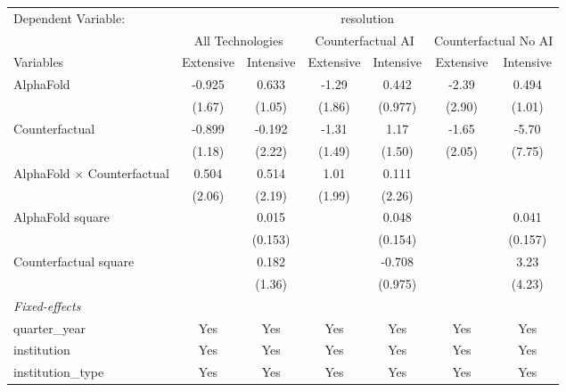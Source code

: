 \begingroup
\centering
\begin{tabular}{lcccccc}
   \tabularnewline \midrule \midrule
   Dependent Variable: & \multicolumn{6}{c}{resolution}\\
 & \multicolumn{2}{c}{All Technologies} & \multicolumn{2}{c}{Counterfactual AI} & \multicolumn{2}{c}{Counterfactual No AI} \\
\cmidrule(lr){1-1}\cmidrule(lr){2-3} \cmidrule(lr){4-5} \cmidrule(lr){6-7}
Variables & \multicolumn{1}{c}{Extensive} & \multicolumn{1}{c}{Intensive} & \multicolumn{1}{c}{Extensive} & \multicolumn{1}{c}{Intensive} & \multicolumn{1}{c}{Extensive} & \multicolumn{1}{c}{Intensive} \\
\cmidrule(lr){1-1}\cmidrule(lr){2-2} \cmidrule(lr){3-3} \cmidrule(lr){4-4} \cmidrule(lr){5-5} \cmidrule(lr){6-6} \cmidrule(lr){7-7}
   AlphaFold                          & -0.925 & 0.633   & -1.29  & 0.442   & -2.39  & 0.494\\   
                                      & (1.67) & (1.05)  & (1.86) & (0.977) & (2.90) & (1.01)\\   
   Counterfactual                     & -0.899 & -0.192  & -1.31  & 1.17    & -1.65  & -5.70\\   
                                      & (1.18) & (2.22)  & (1.49) & (1.50)  & (2.05) & (7.75)\\   
   AlphaFold $\times$ Counterfactual  & 0.504  & 0.514   & 1.01   & 0.111   &        &   \\   
                                      & (2.06) & (2.19)  & (1.99) & (2.26)  &        &   \\   
   AlphaFold square                   &        & 0.015   &        & 0.048   &        & 0.041\\   
                                      &        & (0.153) &        & (0.154) &        & (0.157)\\   
   Counterfactual square              &        & 0.182   &        & -0.708  &        & 3.23\\   
                                      &        & (1.36)  &        & (0.975) &        & (4.23)\\   
   \midrule
   \emph{Fixed-effects}\\
   quarter\_year                      & Yes    & Yes     & Yes    & Yes     & Yes    & Yes\\  
   institution                        & Yes    & Yes     & Yes    & Yes     & Yes    & Yes\\  
   institution\_type                  & Yes    & Yes     & Yes    & Yes     & Yes    & Yes\\  

\end{tabular}
